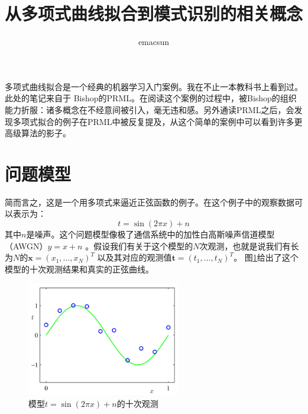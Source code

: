 \documentclass[10pt,a4paper,UTF8]{article}
\author{emacsun}
\date{}
\title{从多项式曲线拟合到模式识别的相关概念}
\begin{document}
\maketitle
\tableofcontents
{}
多项式曲线拟合是一个经典的机器学习入门案例。我在不止一本教科书上看到过。此处的笔记来自于 Bishop的PRML。在阅读这个案例的过程中，被Bishop的组织能力折服：诸多概念在不经意间被引入，毫无违和感。另外通读PRML之后，会发现多项式拟合的例子在PRML中被反复提及，从这个简单的案例中可以看到许多更高级算法的影子。

\section{问题模型}
\label{sec:org58a590f}


简而言之，这是一个用多项式来逼近正弦函数的例子。在这个例子中的观察数据可以表示为：\[ t = \sin(2\pi x) + n\]其中\(n\)是噪声。这个问题模型像极了通信系统中的加性白高斯噪声信道模型（AWGN）\(y=x+n\) 。假设我们有关于这个模型的\(N\)次观测，也就是说我们有长为\(N\)的\(\mathbf{x} = (x_{1},\ldots ,x_{N})^{T}\) 以及其对应的观测值\(\mathbf{t} = (t_{1},\ldots ,t_{N})^{T}\)。 图\ref{fig:orge159bc7}给出了这个模型的十次观测结果和真实的正弦曲线。
\begin{figure}[htbp]
\centering
\includegraphics[width=0.6\textwidth]{../../img/computer_prml/20170430figure1dot2.png}
\caption{\label{fig:orge159bc7}
模型\(t = \sin(2\pi x) + n\)的十次观测}
\end{figure}
\end{document}
